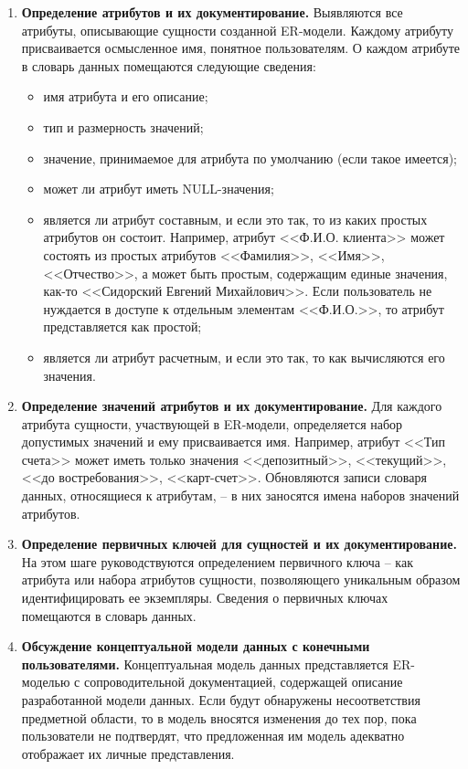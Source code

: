 \begin{enumerate}
	\item \textbf{Определение атрибутов и их документирование.}
	Выявляются все атрибуты, описывающие сущности созданной ER-модели. Каждому атрибуту присваивается осмысленное
	имя, понятное пользователям. О каждом атрибуте в словарь данных помещаются следующие сведения:
	\begin{itemize}
		\item имя атрибута и его описание;
		
		\item тип и размерность значений;
		
		\item значение, принимаемое для атрибута по умолчанию (если такое имеется);
		
		\item может ли атрибут иметь NULL-значения;
		
		\item является ли атрибут составным, и если это так, то из каких простых атрибутов он состоит.
		Например, атрибут <<Ф.И.О. клиента>> может состоять из простых атрибутов <<Фамилия>>, <<Имя>>,
		<<Отчество>>, а может быть простым, содержащим единые значения, как-то <<Сидорский Евгений
		Михайлович>>. Если пользователь не нуждается в доступе к отдельным элементам <<Ф.И.О.>>,
		то атрибут представляется как простой;
		
		\item является ли атрибут расчетным, и если это так, то как вычисляются его значения.
	\end{itemize}
	
	\item \textbf{Определение значений атрибутов и их документирование.}
	Для каждого атрибута сущности, участвующей в ER-модели, определяется набор допустимых значений и ему
	присваивается имя. Например, атрибут <<Тип счета>> может иметь только значения <<депозитный>>, <<текущий>>,
	<<до востребования>>, <<карт-счет>>. Обновляются записи словаря данных, относящиеся к атрибутам, – в них
	заносятся имена наборов значений атрибутов.
	
	\item \textbf{Определение первичных ключей для сущностей и их документирование.}
	На этом шаге руководствуются определением первичного ключа – как атрибута или набора атрибутов сущности,
	позволяющего уникальным образом идентифицировать ее экземпляры. Сведения о первичных ключах помещаются
	в словарь данных.
	
	\item \textbf{Обсуждение концептуальной модели данных с конечными пользователями.}
	Концептуальная модель данных представляется ER-моделью с сопроводительной документацией, содержащей
	описание разработанной модели данных. Если будут обнаружены несоответствия предметной области, то в
	модель вносятся изменения  до тех пор, пока пользователи не подтвердят, что предложенная им модель
	адекватно отображает их личные представления.
\end{enumerate}

